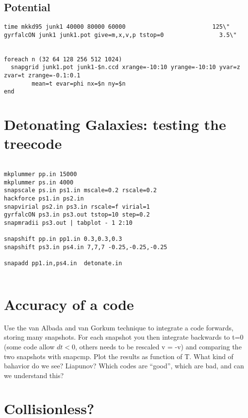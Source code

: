 \subsection{Potential}

\footnotesize\begin{verbatim}
time mkkd95 junk1 40000 80000 60000                         125\"
gyrfalcON junk1 junk1.pot give=m,x,v,p tstop=0                3.5\"


foreach n (32 64 128 256 512 1024)
  snapgrid junk1.pot junk1-$n.ccd xrange=-10:10 yrange=-10:10 yvar=z zvar=t zrange=-0.1:0.1 
        mean=t evar=phi nx=$n ny=$n
end

\end{verbatim}\normalsize  %

\section{Detonating Galaxies: testing the treecode}

\footnotesize\begin{verbatim}

mkplummer pp.in 15000
mkplummer ps.in 4000
snapscale ps.in ps1.in mscale=0.2 rscale=0.2
hackforce ps1.in ps2.in
snapvirial ps2.in ps3.in rscale=f virial=1
gyrfalcON ps3.in ps3.out tstop=10 step=0.2
snapmradii ps3.out | tabplot - 1 2:10

snapshift pp.in pp1.in 0.3,0.3,0.3
snapshift ps3.in ps4.in 7,7,7 -0.25,-0.25,-0.25

snapadd pp1.in,ps4.in  detonate.in


\end{verbatim}\normalsize  

\section{Accuracy of a code}

Use the van Albada and van Gorkum technique to integrate a code
forwards, storing many snapshots. For each snapshot you then integrate
backwards to t=0 (some code allow $dt<0$, others needs to be
rescaled v = -v) and comparing the two snapshots with snapcmp.
Plot the results as function of T. What kind of bahavior do we see?
Liapunov?  Which codes are ``good'', which are bad, and can we 
understand this?


\section{Collisionless?}

